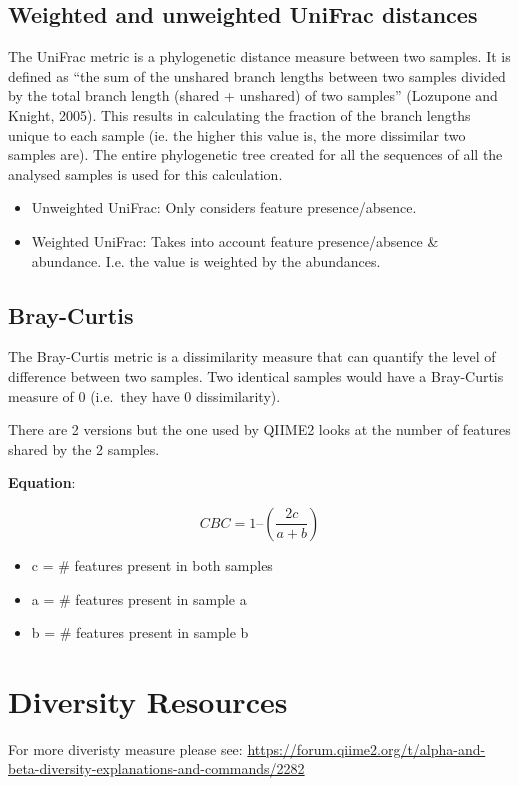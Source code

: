 \documentclass[
]{book}
\providecommand{\tightlist}{%
  \setlength{\itemsep}{0pt}\setlength{\parskip}{0pt}}
\begin{document}
\hypertarget{unifrac_explanation}{%
\subsection{Weighted and unweighted UniFrac distances}\label{unifrac_explanation}}

The UniFrac metric is a phylogenetic distance measure between two samples. It is defined as ``the sum of the unshared branch lengths between two samples divided by the total branch length (shared + unshared) of two samples'' (Lozupone and Knight, 2005). This results in calculating the fraction of the branch lengths unique to each sample (ie. the higher this value is, the more dissimilar two samples are). The entire phylogenetic tree created for all the sequences of all the analysed samples is used for this calculation.

\begin{itemize}
\tightlist
\item
  Unweighted UniFrac: Only considers feature presence/absence.
\item
  Weighted UniFrac: Takes into account feature presence/absence \& abundance. I.e. the value is weighted by the abundances.
\end{itemize}

\hypertarget{bray_explanation}{%
\subsection{Bray-Curtis}\label{bray_explanation}}

The Bray-Curtis metric is a dissimilarity measure that can quantify the level of difference between two samples. Two identical samples would have a Bray-Curtis measure of 0 (i.e.~they have 0 dissimilarity).

There are 2 versions but the one used by QIIME2 looks at the number of features shared by the 2 samples.

\textbf{Equation}:

\[
CBC = 1 – 
(\frac{2c}
{a + b})
\]

\begin{itemize}
\tightlist
\item
  c = \# features present in both samples
\item
  a = \# features present in sample a
\item
  b = \# features present in sample b
\end{itemize}

\hypertarget{diversity-resources}{%
\section{Diversity Resources}\label{diversity-resources}}

For more diveristy measure please see: \url{https://forum.qiime2.org/t/alpha-and-beta-diversity-explanations-and-commands/2282}

  
\end{document}
